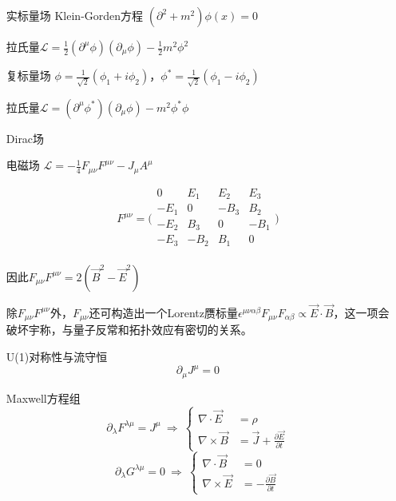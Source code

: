 \begin{itemize}
    \item[实标量场] Klein-Gorden方程 $(\partial^2+m^2)\phi(x)=0$

        拉氏量$\mathcal{L}=\frac{1}{2}(\partial^\mu\phi)(\partial_\mu\phi)-\frac{1}{2}m^2\phi^2$

    \item[复标量场] $\phi=\frac{1}{\sqrt{2}}(\phi_1+i\phi_2)$，$\phi^*=\frac{1}{\sqrt{2}}(\phi_1-i\phi_2)$
        
        拉氏量$\mathcal{L}=(\partial^\mu\phi^*)(\partial_\mu\phi)-m^2\phi^*\phi$
        
    \item[Dirac场]
      
    \item[电磁场] $\mathcal{L}=-\frac{1}{4}F_{\mu\nu}F^{\mu\nu}-J_\mu A^\mu$
        
        \begin{equation}
            F^{\mu\nu}=\Biggl(\begin{matrix}
                0 & E_1 & E_2 & E_3 \\
                -E_1 & 0 & -B_3 & B_2 \\
                -E_2 & B_3 & 0 & -B_1 \\
                -E_3 & -B_2 & B_1 & 0 \\
            \end{matrix}\Biggr)
        \end{equation}
        
        因此$F_{\mu\nu}F^{\mu\nu}=2(\vec{B}^2-\vec{E}^2)$
        
        除$F_{\mu\nu}F^{\mu\nu}$外，$F_{\mu\nu}$还可构造出一个Lorentz赝标量$\epsilon^{\mu\nu\alpha\beta}F_{\mu\nu}F_{\alpha\beta}\propto\vec{E}\cdot\vec{B}$，这一项会破坏宇称，与量子反常和拓扑效应有密切的关系。

        U(1)对称性与流守恒
        \begin{equation}
            \partial_\mu J^\mu=0
        \end{equation}

        Maxwell方程组
        \begin{equation}\label{Maxwell1}
            \partial_\lambda F^{\lambda\mu}=J^\mu
            \ \Rightarrow\ \left\{
                \begin{split}
                    \nabla\cdot\vec{E}&=\rho \\
                    \nabla\times\vec{B}&=\vec{J}+\frac{\partial\vec{E}}{\partial t}
                \end{split}
                \right. 
        \end{equation}
        \begin{equation}\label{Maxwell2}
            \partial_\lambda G^{\lambda\mu}=0
            \ \Rightarrow\ \left\{
                \begin{split}
                    \nabla\cdot\vec{B}&=0 \\
                    \nabla\times\vec{E}&=-\frac{\partial\vec{B}}{\partial t}
                \end{split}
            \right.
        \end{equation}


\end{itemize}
